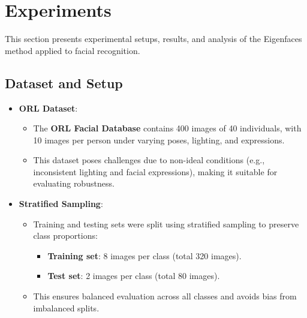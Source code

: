 \documentclass{article}
\begin{document}
	
	\section{Experiments}%
	This section presents experimental setups, results, and analysis of the Eigenfaces method applied to facial recognition.
	
	\subsection{Dataset and Setup}
	\begin{itemize}
		\item \textbf{ORL Dataset}:
		\begin{itemize}
			\item The \textbf{ORL Facial Database} contains 400 images of 40 individuals, with 10 images per person under varying poses, lighting, and expressions.
			\item This dataset poses challenges due to non-ideal conditions (e.g., inconsistent lighting and facial expressions), making it suitable for evaluating robustness.
		\end{itemize}
		
		\item \textbf{Stratified Sampling}:
		\begin{itemize}
			\item Training and testing sets were split using stratified sampling to preserve class proportions:
			\begin{itemize}
				\item \textbf{Training set}: 8 images per class (total 320 images).
				\item \textbf{Test set}: 2 images per class (total 80 images).
			\end{itemize}
			\item This ensures balanced evaluation across all classes and avoids bias from imbalanced splits\cite{Moon2000}.
		\end{itemize}
	\end{itemize}
	
\end{document}

